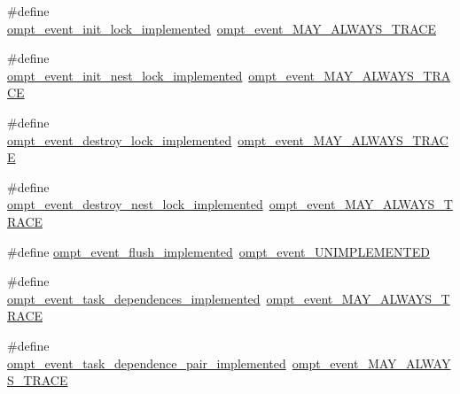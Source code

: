 \begin{DoxyCompactItemize}
\item 
\#define \hyperlink{ompt-event-specific_8h_ae0dfaca8eb234c6104bbd116f7ccf420}{ompt\-\_\-event\-\_\-init\-\_\-lock\-\_\-implemented}~\hyperlink{ompt-event-specific_8h_a81d63d53ff090774864cdd033effe56e}{ompt\-\_\-event\-\_\-\-M\-A\-Y\-\_\-\-A\-L\-W\-A\-Y\-S\-\_\-\-T\-R\-A\-C\-E}
\item 
\#define \hyperlink{ompt-event-specific_8h_a11a1812ef4fbddc76fb54aa302a9361c}{ompt\-\_\-event\-\_\-init\-\_\-nest\-\_\-lock\-\_\-implemented}~\hyperlink{ompt-event-specific_8h_a81d63d53ff090774864cdd033effe56e}{ompt\-\_\-event\-\_\-\-M\-A\-Y\-\_\-\-A\-L\-W\-A\-Y\-S\-\_\-\-T\-R\-A\-C\-E}
\item 
\#define \hyperlink{ompt-event-specific_8h_a59548df7cea7950fb7621716c89d5f46}{ompt\-\_\-event\-\_\-destroy\-\_\-lock\-\_\-implemented}~\hyperlink{ompt-event-specific_8h_a81d63d53ff090774864cdd033effe56e}{ompt\-\_\-event\-\_\-\-M\-A\-Y\-\_\-\-A\-L\-W\-A\-Y\-S\-\_\-\-T\-R\-A\-C\-E}
\item 
\#define \hyperlink{ompt-event-specific_8h_a8804e42303b5e72ddf4e41a93af1c2a8}{ompt\-\_\-event\-\_\-destroy\-\_\-nest\-\_\-lock\-\_\-implemented}~\hyperlink{ompt-event-specific_8h_a81d63d53ff090774864cdd033effe56e}{ompt\-\_\-event\-\_\-\-M\-A\-Y\-\_\-\-A\-L\-W\-A\-Y\-S\-\_\-\-T\-R\-A\-C\-E}
\item 
\#define \hyperlink{ompt-event-specific_8h_a85b26190f3db8f57b2cdd188b53c969a}{ompt\-\_\-event\-\_\-flush\-\_\-implemented}~\hyperlink{ompt-event-specific_8h_a5719430a79b410eee8d68fcec0fbf8f2}{ompt\-\_\-event\-\_\-\-U\-N\-I\-M\-P\-L\-E\-M\-E\-N\-T\-E\-D}
\item 
\#define \hyperlink{ompt-event-specific_8h_a066a95e0c3534140847f7f5c023197e0}{ompt\-\_\-event\-\_\-task\-\_\-dependences\-\_\-implemented}~\hyperlink{ompt-event-specific_8h_a81d63d53ff090774864cdd033effe56e}{ompt\-\_\-event\-\_\-\-M\-A\-Y\-\_\-\-A\-L\-W\-A\-Y\-S\-\_\-\-T\-R\-A\-C\-E}
\item 
\#define \hyperlink{ompt-event-specific_8h_aaa3a35e4499573e68b7c801ad743659d}{ompt\-\_\-event\-\_\-task\-\_\-dependence\-\_\-pair\-\_\-implemented}~\hyperlink{ompt-event-specific_8h_a81d63d53ff090774864cdd033effe56e}{ompt\-\_\-event\-\_\-\-M\-A\-Y\-\_\-\-A\-L\-W\-A\-Y\-S\-\_\-\-T\-R\-A\-C\-E}
\end{DoxyCompactItemize}


